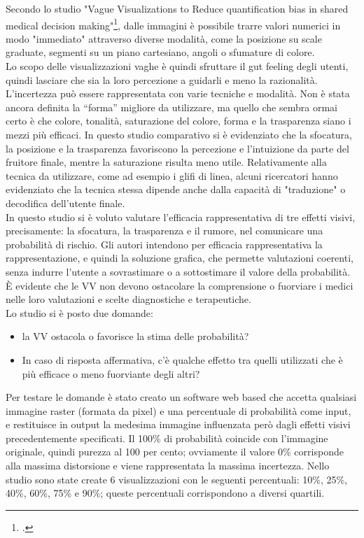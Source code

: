 Secondo lo studio "Vague Visualizations to Reduce quantification bias in shared medical decision making"\footcite{womak:vague-visualizations-quantification-bias}, dalle immagini è possibile trarre valori numerici in modo "immediato" attraverso diverse modalità, come la posizione su scale graduate, segmenti su un piano cartesiano, angoli o sfumature di colore.\\
Lo scopo delle visualizzazioni vaghe è quindi sfruttare il gut feeling degli utenti, quindi lasciare che sia la loro percezione a guidarli e meno la razionalità.\\
L'incertezza può essere rappresentata con varie tecniche e modalità. Non è stata ancora definita la “forma”
migliore da utilizzare, ma quello che sembra ormai certo è che colore, tonalità, saturazione del colore,
forma e la trasparenza siano i mezzi più efficaci. In questo studio comparativo si è evidenziato che la
sfocatura, la posizione e la trasparenza favoriscono la percezione e l'intuizione da parte del fruitore finale, mentre la saturazione risulta meno utile. Relativamente alla tecnica da utilizzare, come ad esempio i glifi di linea, alcuni ricercatori hanno evidenziato che la tecnica stessa dipende anche dalla capacità di "traduzione" o decodifica dell'utente finale.\\

In questo studio si è voluto valutare l'efficacia rappresentativa di tre effetti visivi, precisamente: la sfocatura, la trasparenza e il rumore, nel comunicare una probabilità di rischio. Gli autori intendono per efficacia rappresentativa la rappresentazione, e quindi la soluzione grafica, che permette valutazioni coerenti, senza indurre l'utente a sovrastimare o a sottostimare il valore della probabilità. È evidente che le VV non devono ostacolare la comprensione o fuorviare i medici nelle loro valutazioni e scelte diagnostiche e terapeutiche.\\ 
Lo studio si è posto due domande:
\begin{itemize}
    \item la VV ostacola o favorisce la stima delle probabilità?
    \item In caso di risposta affermativa, c'è qualche effetto tra quelli utilizzati che è più efficace o meno
    fuorviante degli altri?
\end{itemize}
Per testare le domande è stato creato un software web based che accetta qualsiasi immagine raster (formata da pixel) e una percentuale di probabilità come input, e restituisce in output la medesima immagine influenzata però dagli effetti visivi precedentemente specificati. Il 100\% di probabilità coincide con l'immagine originale, quindi purezza al 100 per cento; ovviamente il valore 0\% corrisponde alla massima distorsione e viene rappresentata la massima incertezza.
Nello studio sono state create 6 visualizzazioni con le seguenti percentuali: 10\%, 25\%, 40\%, 60\%, 75\% e 90\%; queste percentuali corrispondono a diversi \gls{quartili}.

